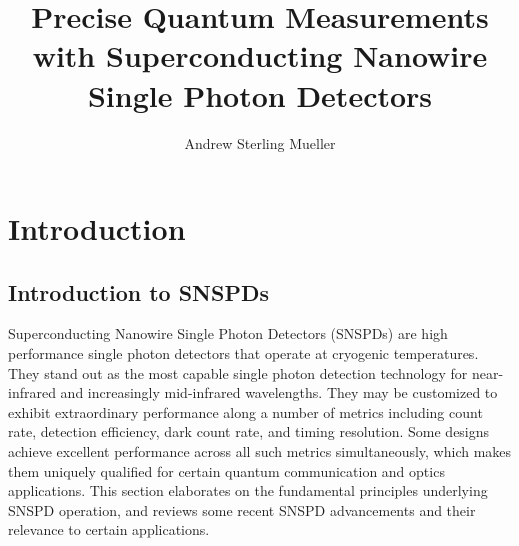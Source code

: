 \documentclass[11pt]{caltech_thesis} %
\begin{document}
\title{Precise Quantum Measurements with Superconducting Nanowire Single Photon Detectors}
\author{Andrew Sterling Mueller}
\address{Pasadena, California}                     
       




\maketitle[logo]

\begin{acknowledgements}   
    
\end{acknowledgements}

\begin{abstract}
   
\end{abstract}

\begin{publishedcontent}

\end{publishedcontent}

\tableofcontents
\listoffigures
\listoftables
\printnomenclature
\mainmatter

\hypertarget{introduction}{%
\chapter{Introduction}\label{introduction}}

\hypertarget{introduction-to-snspds}{%
\section{Introduction to SNSPDs}\label{introduction-to-snspds}}

Superconducting Nanowire Single Photon Detectors (SNSPDs) are high performance single photon detectors that operate at cryogenic temperatures. They stand out as the most capable single photon detection technology for near-infrared and increasingly mid-infrared wavelengths. They may be customized to exhibit extraordinary performance along a number of metrics including count rate, detection efficiency, dark count rate, and timing resolution. Some designs achieve excellent performance across all such metrics simultaneously, which makes them uniquely qualified for certain quantum communication and optics applications. This section elaborates on the fundamental principles underlying SNSPD operation, and reviews some recent SNSPD advancements and their relevance to certain applications.
\end{document}
